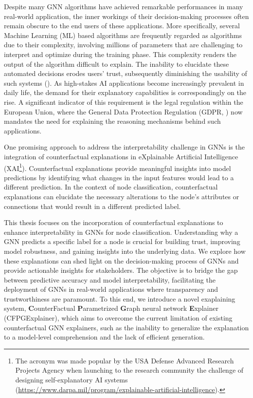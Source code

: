 \documentclass[binding=0.6cm]{sapthesis}
\newcommand{\mycite}[1]{(\cite{#1})}
\begin{document}
Despite many GNN algorithms have achieved remarkable performances in many real-world application, the inner workings of their decision-making processes often remain obscure to the end users of these applications.
More specifically, several Machine Learning (ML) based algorithms are frequently regarded as  algorithms due to their complexity, involving millions of parameters that are challenging to interpret and optimize during the training phase. This complexity renders the output of the algorithm difficult to explain. 
The inability to elucidate these automated decisions erodes users' trust, subsequently diminishing the usability of such systems \mycite{ribeiro2016-lime}.
As high-stakes AI applications become increasingly prevalent in daily life, the demand for their explanatory capabilities is correspondingly on the rise. A significant indicator of this requirement is the legal regulation within the European Union, where the General Data Protection Regulation (GDPR, \cite{eu-679-2016}) now mandates the need for explaining the reasoning mechanisms behind such applications.

One promising approach to address the interpretability challenge in GNNs is the integration of counterfactual explanations in eXplainable Artificial Intelligence (XAI\footnote{The acronym was made popular by the USA Defense Advanced Research Projects Agency when launching to the research community the challenge of designing self-explanatory AI systems (\url{https://www.darpa.mil/program/explainable-artificial-intelligence}).}). Counterfactual explanations provide meaningful insights into model predictions by identifying what changes in the input features would lead to a different prediction. In the context of node classification, counterfactual explanations can elucidate the necessary alterations to the node's attributes or connections that would result in a different predicted label.

This thesis focuses on the incorporation of counterfactual explanations to enhance interpretability in GNNs for node classification. Understanding why a GNN predicts a specific label for a node is crucial for building trust, improving model robustness, and gaining insights into the underlying data. We explore how these explanations can shed light on the decision-making process of GNNs and provide actionable insights for stakeholders. 
The objective is to bridge the gap between predictive accuracy and model interpretability, facilitating the deployment of GNNs in real-world applications where transparency and trustworthiness are paramount. To this end, we introduce a novel exaplaining system, \textbf{C}ounterFactual \textbf{P}arametrized \textbf{G}raph neural network \textbf{E}xplainer (CFPGExplainer), which aims to overcome the current limitation of existing counterfactual GNN explainers, such as the inability to generalize the explanation to a model-level comprehension and the lack of efficient generation. 
\end{document}
